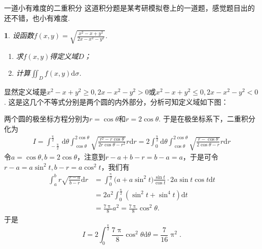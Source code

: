 \documentclass[UTF8,no-math,12pt,openany,table,dvipsnames,svgnames]{book}
\renewcommand{\pi}{\uppi}
\newcommand{\hei}{\CJKfamily{hei}}
\newenvironment{solve}{\par\indent{\hei 解}\hspace{1em}}{\par}
\newtheorem{example}{}
\renewcommand{\le}{\leqslant}
\renewcommand{\ge}{\geqslant}
\begin{document}
\begin{MYBOX}[colbacktitle=blue]{一道小有难度的二重积分}
这道积分题是某考研模拟卷上的一道题，感觉题目出的还不错，也小有难度.
\setcounter{example}{0}
\begin{example}
  设函数$f(x,y)=\sqrt{\frac{x^2-x+y^2}{2x-x^2-y^2}}$.
  \begin{enumerate}
    \item 求$f(x,y)$得定义域$D$；
    \item 计算$\iint_Df(x,y)\mathrm d\sigma$.
  \end{enumerate}
\end{example}
\tcblower
\begin{solve}
  显然定义域是$x^2-x+y^2\ge0,2x-x^2-y^2>0$或$x^2-x+y^2\le0,2x-x^2-y^2<0$. 这是这几个不等式分别是两个圆的内外部分，分析可知定义域如下图：
  \begin{center}
  \end{center}
  两个圆的极坐标方程分别为$r=\cos\theta$和$r=2\cos\theta$. 于是在极坐标系下，二重积分化为
  \begin{align*}
    I = \int_{-\frac\pi2}^{\frac\pi2}\mathrm d\theta
    \int_{\cos\theta}^{2\cos\theta}\sqrt{\frac{r^2-r\cos\theta}{2r\cos\theta-r^2}}r\mathrm dr
    = 2\int_0^{\frac\pi2}\mathrm d\theta
    \int_{\cos\theta}^{2\cos\theta}
    \sqrt{\frac{r-\cos\theta}{2\cos\theta-r}}r \mathrm dr
  \end{align*}
  令$a=\cos\theta,b=2\cos\theta$，注意到$r-a+b-r=b-a=a$，于是可令$r-a=a\sin^2t,b-r=a\cos^2t$，我们有
  \begin{align*}
    \int_a^b r\sqrt{\frac{r-a}{b-r}}\mathrm dr
    & = \int_0^{\frac\pi2}\big( a + a\sin^2t \big)\frac{\sin t}{\cos t}\cdot 2a\sin t\cos t\mathrm dt\\
    & = 2a^2 \int_0^{\frac\pi2} (\sin^2t + \sin^4t)\mathrm dt\\
    & = \frac{7\pi}8a^2= \frac{7\pi}8\cos^2\theta.
  \end{align*}
  于是
  \[
    I = 2\int_0^{\frac\pi2} \frac{7\pi}8\cos^2\theta \mathrm d\theta = \frac7{16}\pi^2.
  \]
\end{solve}

\end{MYBOX}
\end{document}
